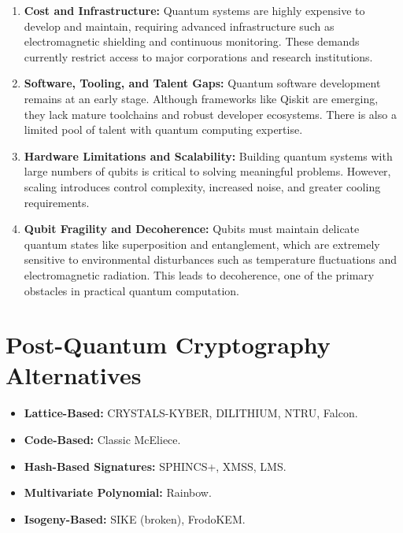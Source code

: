 \documentclass{article}
\begin{document}
\begin{enumerate}
    \item \textbf{Cost and Infrastructure:} Quantum systems are highly expensive to develop and maintain, requiring advanced infrastructure such as electromagnetic shielding and continuous monitoring. These demands currently restrict access to major corporations and research institutions.

    \item \textbf{Software, Tooling, and Talent Gaps:} Quantum software development remains at an early stage. Although frameworks like Qiskit are emerging, they lack mature toolchains and robust developer ecosystems. There is also a limited pool of talent with quantum computing expertise.

    \item \textbf{Hardware Limitations and Scalability:} Building quantum systems with large numbers of qubits is critical to solving meaningful problems. However, scaling introduces control complexity, increased noise, and greater cooling requirements.

    \item \textbf{Qubit Fragility and Decoherence:} Qubits must maintain delicate quantum states like superposition and entanglement, which are extremely sensitive to environmental disturbances such as temperature fluctuations and electromagnetic radiation. This leads to decoherence, one of the primary obstacles in practical quantum computation.
\end{enumerate}

\section{Post-Quantum Cryptography Alternatives}

\begin{itemize}
    \item \textbf{Lattice-Based:} CRYSTALS-KYBER, DILITHIUM, NTRU, Falcon.
    \item \textbf{Code-Based:} Classic McEliece.
    \item \textbf{Hash-Based Signatures:} SPHINCS+, XMSS, LMS.
    \item \textbf{Multivariate Polynomial:} Rainbow.
    \item \textbf{Isogeny-Based:} SIKE (broken), FrodoKEM.
\end{itemize}
\end{document}
